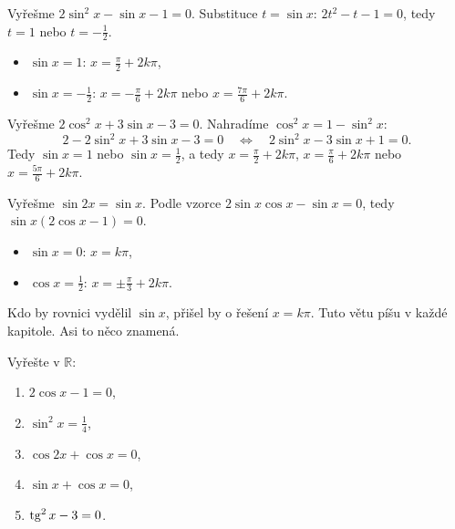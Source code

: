 \begin{example}
  Vyřešme $2\sin^2 x - \sin x - 1 = 0$. Substituce $t = \sin x$: $2t^2 - t - 1 = 0$, tedy $t = 1$ nebo $t = -\frac{1}{2}$.
  \begin{itemize}
    \item $\sin x = 1$: $x = \frac{\pi}{2} + 2k\pi$,
    \item $\sin x = -\frac{1}{2}$: $x = -\frac{\pi}{6} + 2k\pi$ nebo $x = \frac{7\pi}{6} + 2k\pi$.
  \end{itemize}
\end{example}

\begin{example}
  Vyřešme $2\cos^2 x + 3\sin x - 3 = 0$. Nahradíme $\cos^2 x = 1 - \sin^2 x$:
  \begin{equation*}
    2 - 2\sin^2 x + 3\sin x - 3 = 0\quad\Leftrightarrow\quad 2\sin^2 x - 3\sin x + 1 = 0.
  \end{equation*}
  Tedy $\sin x = 1$ nebo $\sin x = \frac{1}{2}$, a tedy $x = \frac{\pi}{2} + 2k\pi$, $x = \frac{\pi}{6} + 2k\pi$ nebo $x = \frac{5\pi}{6} + 2k\pi$.
\end{example}

\begin{example}
  Vyřešme $\sin 2x = \sin x$. Podle vzorce $2\sin x\cos x - \sin x = 0$, tedy $\sin x(2\cos x - 1) = 0$.
  \begin{itemize}
    \item $\sin x = 0$: $x = k\pi$,
    \item $\cos x = \frac{1}{2}$: $x = \pm\frac{\pi}{3} + 2k\pi$.
  \end{itemize}
  Kdo by rovnici vydělil $\sin x$, přišel by o řešení $x = k\pi$. Tuto větu píšu v každé kapitole. Asi to něco znamená.
\end{example}

\begin{problem}
  Vyřešte v $\mathbb{R}$:
  \begin{enumerate}[label=(\alph*)]
    \item $2\cos x - 1 = 0$,
    \item $\sin^2 x = \frac{1}{4}$,
    \item $\cos 2x + \cos x = 0$,
    \item $\sin x + \cos x = 0$,
    \item $\operatorname{tg}^2 x - 3 = 0$.
  \end{enumerate}
\end{problem}

